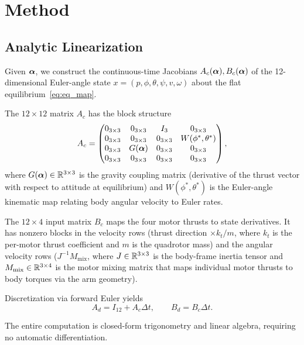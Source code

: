 \section{Method}\label{sec:method}

\subsection{Analytic Linearization}\label{sec:linearize}

Given $\bm{\alpha}$, we construct the continuous-time Jacobians
$A_c(\bm{\alpha}), B_c(\bm{\alpha})$ of the 12-dimensional
Euler-angle state
$x = (p, \phi, \theta, \psi, v, \omega)$
about the flat equilibrium~\eqref{eq:eq_map}.

The $12 \times 12$ matrix $A_c$ has the block structure
\begin{equation}\label{eq:Ac}
  A_c = \begin{pmatrix}
    0_{3\times3} & 0_{3\times3} & I_3 & 0_{3\times3} \\
    0_{3\times3} & 0_{3\times3} & 0_{3\times3} & W(\phi^*,\theta^*) \\
    0_{3\times3} & G(\bm{\alpha})   & 0_{3\times3} & 0_{3\times3} \\
    0_{3\times3} & 0_{3\times3} & 0_{3\times3} & 0_{3\times3}
  \end{pmatrix},
\end{equation}
where $G(\bm{\alpha}) \in \mathbb{R}^{3\times3}$ is the gravity coupling matrix
(derivative of the thrust vector with respect to attitude at equilibrium)
and $W(\phi^*, \theta^*)$ is the Euler-angle kinematic map
relating body angular velocity to Euler rates.

The $12 \times 4$ input matrix $B_c$ maps the four motor
thrusts to state derivatives.
It has nonzero blocks in
the velocity rows (thrust direction $\times k_t / m$,
where $k_t$ is the per-motor thrust coefficient and
$m$ is the quadrotor mass)
and the angular velocity rows
($J^{-1} M_{\mathrm{mix}}$,
where $J \in \mathbb{R}^{3\times3}$ is the body-frame inertia
tensor and $M_{\mathrm{mix}} \in \mathbb{R}^{3\times4}$ is
the motor mixing matrix that maps individual motor
thrusts to body torques via the arm geometry).

Discretization via forward Euler yields
\begin{equation}\label{eq:disc}
  A_d = I_{12} + A_c \Delta t, \qquad
  B_d = B_c \Delta t.
\end{equation}

The entire computation is closed-form trigonometry and linear algebra,
requiring no automatic differentiation.

